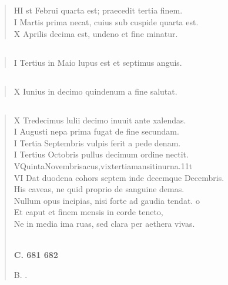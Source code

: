 \documentclass[11pt, a4paper]{report}
\begin{document}
            \subsection*{}
      \begin{verse}
      HI st Februi quarta est; praecedit tertia finem. \\ I Martis prima necat, cuius sub cuspide quarta est. \\ X Aprilis decima est, undeno et fine minatur. \\ 
      \end{verse}
  
            \subsection*{}
      \begin{verse}
       \lbrack I Tertius in Maio lupus est et septimus anguis. \\ 
      \end{verse}
  
            \subsection*{}
      \begin{verse}
      X Iunius in decimo quindenum a fine salutat. \\ 
      \end{verse}
  
            \subsection*{}
      \begin{verse}
      X Tredecimus lulii decimo inuuit ante xalendas. \\ I Augusti nepa prima fugat de fine secundam. \\  \lbrack  I Tertia Septembris vulpis ferit a pede denam. \\ I Tertius Octobris pullus decimum ordine nectit. \\ VQuintaNovembrisacus,vixtertiamansitinurna.11t \\ VI Dat duodena cohors septem inde decemque Decembris. \\ His caveas, ne quid proprio de sanguine demas. \\ Nullum opus incipias, nisi forte ad gaudia tendat. o \\ Et caput et finem mensis in corde teneto, \\ Ne in media ima ruas, sed clara per aethera vivas. \\ 
        ﻿\pagebreak 
     \marginpar{[158]} \begin{center} \textbf{C. 681 682} \end{center}B. . \\ 
      \end{verse}
  
\end{document}
